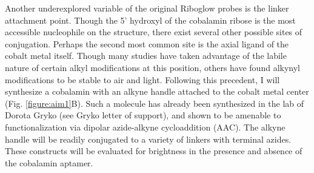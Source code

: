 Another underexplored variable of the original Riboglow probes is the linker attachment point. Though the 5' hydroxyl of the cobalamin ribose is the most accessible nucleophile on the structure, there exist several other possible sites of conjugation. Perhaps the second most common site is the axial ligand of the cobalt metal itself. Though many studies have taken advantage of the labile nature of certain alkyl modifications at this position,\cite{ShellVitaminB12Tunable2015} others have found alkynyl modifications to be stable to air and light.\cite{ChrominskiReductionfreesynthesisstable2013,RuetzMarkusPhenylethynylcobalaminLightStable2013} Following this precedent, I will synthesize a cobalamin with an alkyne handle attached to the cobalt metal center (Fig. \ref{figure:aim1}B). Such a molecule has already been synthesized in the lab of Dorota Gryko (see Gryko letter of support), and shown to be amenable to functionalization via dipolar azide-alkyne cycloaddition (AAC).\cite{ChrominskiVitaminB12Derivatives2014} The alkyne handle will be readily conjugated to a variety of linkers with terminal azides.  These constructs will be evaluated for brightness in the presence and absence of the cobalamin aptamer.


